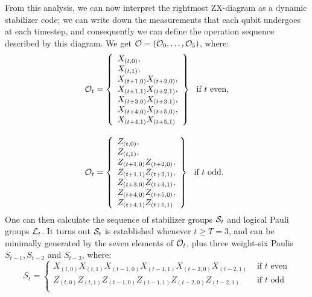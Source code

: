 From this analysis, we can now interpret the rightmost ZX-diagram as a dynamic stabilizer code;
we can write down the measurements that each qubit undergoes at each timestep,
and consequently we can define the operation sequence described by this diagram.
We get $\mathcal{O} = (\mathcal{O}_0, \ldots, \mathcal{O}_5)$, where:
\begin{equation}\label{eq:floquetified_4_2_2_measurement_schedule}
    \begin{aligned}
        \mathcal{O}_t &= \left\{
        \begin{array}{l}
             X_{(t, 0)}, \\
             X_{(t, 1)}, \\
             X_{(t+1, 0)}X_{(t+2, 0)}, \\
             X_{(t+1, 1)}X_{(t+2, 1)}, \\
             X_{(t+3, 0)}X_{(t+3, 1)}, \\
             X_{(t+4, 0)}X_{(t+5, 0)}, \\
             X_{(t+4, 1)}X_{(t+5, 1)}
        \end{array}
        \right\}
        \text{~~if $t$ even,} \\[10pt]
        \mathcal{O}_t &= \left\{
        \begin{array}{l}
             Z_{(t, 0)}, \\
             Z_{(t, 1)}, \\
             Z_{(t+1, 0)}Z_{(t+2, 0)}, \\
             Z_{(t+1, 1)}Z_{(t+2, 1)}, \\
             Z_{(t+3, 0)}Z_{(t+3, 1)}, \\
             Z_{(t+4, 0)}Z_{(t+5, 0)}, \\
             Z_{(t+4, 1)}Z_{(t+5, 1)}
        \end{array}
        \right\}
        \text{~~if $t$ odd.}
    \end{aligned}
\end{equation}
One can then calculate the sequence of stabilizer groups $\mathcal{S}_t$ and logical Pauli groups $\mathcal{L}_t$.
It turns out $\mathcal{S}_t$ is established whenever $t \geq T = 3$,
and can be minimally generated by the seven elements of $\mathcal{O}_t$,
plus three weight-six Paulis $S_{t-1}, S_{t-2}$ and $S_{t-3}$, where:
\begin{equation}\label{eq:floquetified_4_2_2_s_t}
S_t = \begin{cases}
          X_{(t, 0)}X_{(t, 1)}X_{(t-1, 0)}X_{(t-1, 1)}X_{(t-2, 0)}X_{(t-2, 1)} &\text{ if $t$ even} \\
          Z_{(t, 0)}Z_{(t, 1)}Z_{(t-1, 0)}Z_{(t-1, 1)}Z_{(t-2, 0)}Z_{(t-2, 1)} &\text{ if $t$ odd} \\
\end{cases}
\end{equation}

